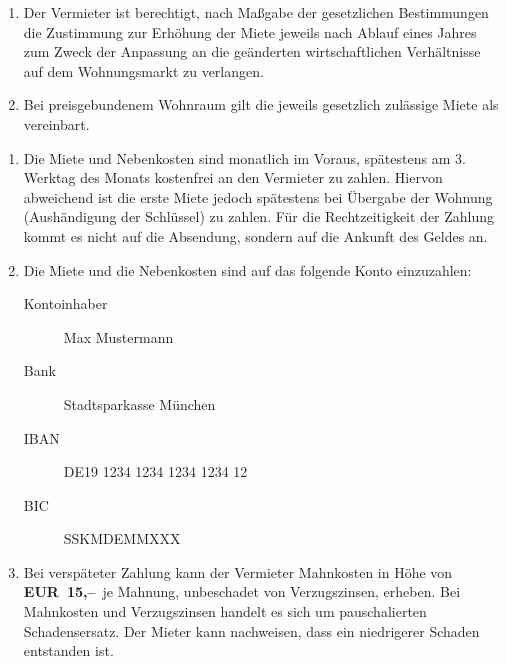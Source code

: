 \documentclass{scrreprt}[12pt,a4paper,twoside,duplex]
\newcommand{\vermieter}{\textcolor{zuBearbeiten}{Max Mustermann}}
\newcommand{\vermieterBankname}{\textcolor{zuBearbeiten}{Stadtsparkasse M\"unchen}}
\newcommand{\vermieterIBAN}{\textcolor{zuBearbeiten}{DE19 1234 1234 1234 1234 12}}
\newcommand{\vermieterBIC}{\textcolor{zuBearbeiten}{SSKMDEMMXXX}}
\newcommand{\vermieterMahnkosten}{\textcolor{zuBearbeiten}{15,--}}
\newcommand{\mietWaehrung}{\textcolor{zuBearbeiten}{EUR}}
\begin{document}
\begin{contract}
\begin{enumerate}
  \item Der Vermieter ist berechtigt, nach Maßgabe der gesetzlichen Bestimmungen
   die Zustimmung zur Erhöhung der Miete jeweils nach Ablauf eines Jahres zum
   Zweck der Anpassung an die geänderten wirtschaftlichen Verhältnisse auf dem
   Wohnungsmarkt zu verlangen.
   \item Bei preisgebundenem Wohnraum gilt die jeweils gesetzlich zulässige
   Miete als vereinbart.
\end{enumerate}
\end{contract}

\begin{contract}
  \begin{enumerate}
    \item Die Miete und Nebenkosten sind monatlich im Voraus, spätestens am 3.
    Werktag des Monats kostenfrei an den Vermieter zu zahlen. Hiervon abweichend
    ist die erste Miete jedoch spätestens bei Übergabe der Wohnung (Aushändigung
    der Schlüssel) zu zahlen. Für die Rechtzeitigkeit der Zahlung kommt es nicht
    auf die Absendung, sondern auf die Ankunft des Geldes an.
    \item Die Miete und die Nebenkosten sind auf das folgende Konto einzuzahlen:
    \begin{description}
      \item[Kontoinhaber] \vermieter
      \item[Bank] \vermieterBankname
      \item[IBAN] \vermieterIBAN
      \item[BIC] \vermieterBIC
    \end{description}
    \item Bei verspäteter Zahlung kann der Vermieter Mahnkosten in Höhe von
    \textbf{\mietWaehrung\ \vermieterMahnkosten}\ je Mahnung, unbeschadet von
    Verzugszinsen, erheben. Bei Mahnkosten und Verzugszinsen handelt es sich um
    pauschalierten Schadensersatz. Der Mieter kann nachweisen, dass ein
    niedrigerer Schaden entstanden ist.
  \end{enumerate}
\end{contract}
\end{document}
